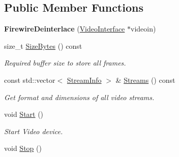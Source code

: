 \subsection*{Public Member Functions}
\begin{DoxyCompactItemize}
\item 
{\bfseries Firewire\+Deinterlace} (\hyperlink{structpangolin_1_1_video_interface}{Video\+Interface} $\ast$videoin)\hypertarget{classpangolin_1_1_firewire_deinterlace_a73c8249ab0a378c53126c1eee1cbeb31}{}\label{classpangolin_1_1_firewire_deinterlace_a73c8249ab0a378c53126c1eee1cbeb31}

\item 
size\+\_\+t \hyperlink{classpangolin_1_1_firewire_deinterlace_a58027da028da58434244fc685be8eee5}{Size\+Bytes} () const \hypertarget{classpangolin_1_1_firewire_deinterlace_a58027da028da58434244fc685be8eee5}{}\label{classpangolin_1_1_firewire_deinterlace_a58027da028da58434244fc685be8eee5}

\begin{DoxyCompactList}\small\item\em Required buffer size to store all frames. \end{DoxyCompactList}\item 
const std\+::vector$<$ \hyperlink{classpangolin_1_1_stream_info}{Stream\+Info} $>$ \& \hyperlink{classpangolin_1_1_firewire_deinterlace_a9942d1a457c2ef3f32747fd8e19c8e83}{Streams} () const \hypertarget{classpangolin_1_1_firewire_deinterlace_a9942d1a457c2ef3f32747fd8e19c8e83}{}\label{classpangolin_1_1_firewire_deinterlace_a9942d1a457c2ef3f32747fd8e19c8e83}

\begin{DoxyCompactList}\small\item\em Get format and dimensions of all video streams. \end{DoxyCompactList}\item 
void \hyperlink{classpangolin_1_1_firewire_deinterlace_acb1fbdec5835d754db4a197fdc801ab3}{Start} ()\hypertarget{classpangolin_1_1_firewire_deinterlace_acb1fbdec5835d754db4a197fdc801ab3}{}\label{classpangolin_1_1_firewire_deinterlace_acb1fbdec5835d754db4a197fdc801ab3}

\begin{DoxyCompactList}\small\item\em Start Video device. \end{DoxyCompactList}\item 
void \hyperlink{classpangolin_1_1_firewire_deinterlace_a614914e451e2179a44b31f2a50841330}{Stop} ()\hypertarget{classpangolin_1_1_firewire_deinterlace_a614914e451e2179a44b31f2a50841330}{}\label{classpangolin_1_1_firewire_deinterlace_a614914e451e2179a44b31f2a50841330}


\end{DoxyCompactItemize}

